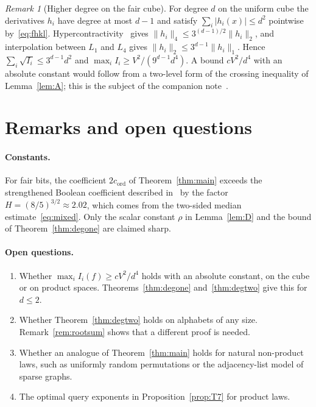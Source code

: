 \documentclass[11pt]{article}
\numberwithin{equation}{section}
\newcommand{\Cmon}{c_{\mathrm{ord}}}
\theoremstyle{plain}
\theoremstyle{remark}
\newtheorem{remark}[theorem]{Remark}
\begin{document}
\begin{remark}[Higher degree on the fair cube]\label{rem:bonami}
For degree $d$ on the uniform cube the derivatives $h_i$ have degree at most $d-1$ and satisfy $\sum_i|h_i(x)|\le d^2$ pointwise by~\eqref{eq:fhkl}. Hypercontractivity~\cite{Bon70} gives $\|h_i\|_4\le3^{(d-1)/2}\|h_i\|_2$, and interpolation between $L_1$ and $L_4$ gives $\|h_i\|_2\le3^{d-1}\|h_i\|_1$. Hence $\sum_i\sqrt{I_i}\le3^{d-1}d^2$ and $\max_iI_i\ge V^2/(9^{d-1}d^4)$. A bound $cV^2/d^4$ with an absolute constant would follow from a two-level form of the crossing inequality of Lemma~\ref{lem:A}; this is the subject of the companion note~\cite{WrightQuartic}.
\end{remark}

\section{Remarks and open questions}\label{sec:open}
\paragraph{Constants.} For fair bits, the coefficient $2\Cmon$ of Theorem~\ref{thm:main} exceeds the strengthened Boolean coefficient described in~\cite[Remark~8.4]{Tur26} by the factor $H=(8/5)^{3/2}\approx2.02$, which comes from the two-sided median estimate~\eqref{eq:mixed}. Only the scalar constant $\rho$ in Lemma~\ref{lem:D} and the bound of Theorem~\ref{thm:degone} are claimed sharp.

\paragraph{Open questions.}
\begin{enumerate}[leftmargin=*,itemsep=1pt]
\item Whether $\max_iI_i(f)\ge cV^2/d^4$ holds with an absolute constant, on the cube or on product spaces. Theorems~\ref{thm:degone} and~\ref{thm:degtwo} give this for $d\le2$.
\item Whether Theorem~\ref{thm:degtwo} holds on alphabets of any size. Remark~\ref{rem:rootsum} shows that a different proof is needed.
\item Whether an analogue of Theorem~\ref{thm:main} holds for natural non-product laws, such as uniformly random permutations or the adjacency-list model of sparse graphs.
\item The optimal query exponents in Proposition~\ref{prop:T7} for product laws.
\end{enumerate}
\end{document}
